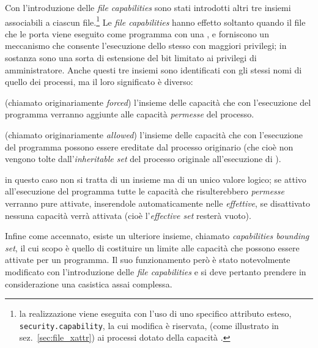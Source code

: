 Con l'introduzione delle \textit{file capabilities} sono stati introdotti
altri tre insiemi associabili a ciascun file.\footnote{la realizzazione viene
  eseguita con l'uso di uno specifico attributo esteso,
  \texttt{security.capability}, la cui modifica è riservata, (come illustrato
  in sez.~\ref{sec:file_xattr}) ai processi dotato della capacità
  .} Le \textit{file capabilities} hanno effetto
soltanto quando il file che le porta viene eseguito come programma con una
, e forniscono un meccanismo che consente l'esecuzione dello stesso
con maggiori privilegi; in sostanza sono una sorta di estensione del
 bit limitato ai privilegi di amministratore. Anche questi tre
insiemi sono identificati con gli stessi nomi di quello dei processi, ma il
loro significato è diverso:
\begin{basedescript}{\desclabelwidth{2.1cm}\desclabelstyle{\nextlinelabel}}
\item[\textit{permitted}] (chiamato originariamente \textit{forced}) l'insieme
  delle capacità che con l'esecuzione del programma verranno aggiunte alle
  capacità \textsl{permesse} del processo.
\item[\textit{inheritable}] (chiamato originariamente \textit{allowed})
  l'insieme delle capacità che con l'esecuzione del programma possono essere
  ereditate dal processo originario (che cioè non vengono tolte
  dall'\textit{inheritable set} del processo originale all'esecuzione di
  ).
\item[\textit{effective}] in questo caso non si tratta di un insieme ma di un
  unico valore logico; se attivo all'esecuzione del programma tutte le
  capacità che risulterebbero \textsl{permesse} verranno pure attivate,
  inserendole automaticamente nelle \textsl{effettive}, se disattivato nessuna
  capacità verrà attivata (cioè l'\textit{effective set} resterà vuoto).
\end{basedescript}


Infine come accennato, esiste un ulteriore insieme, chiamato
\textit{capabilities bounding set}, il cui scopo è quello di costituire un
limite alle capacità che possono essere attivate per un programma. Il suo
funzionamento però è stato notevolmente modificato con l'introduzione delle
\textit{file capabilities} e si deve pertanto prendere in considerazione una
casistica assai complessa.

